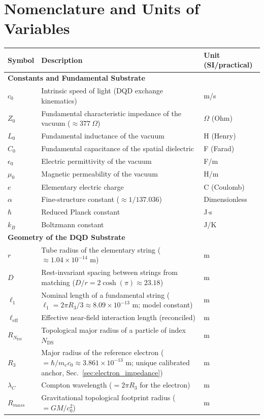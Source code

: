 \documentclass[11pt,a4paper]{article}
\theoremstyle{plain}
\theoremstyle{remark}
\newcommand{\Ncd}{\ensuremath{N_{\mathrm{DS}}}}
\begin{document}
\newpage
\section{Nomenclature and Units of Variables}
\begin{longtable}{l >{\raggedright\arraybackslash}p{8.8cm} l}
\toprule
\textbf{Symbol} & \textbf{Description} & \textbf{Unit (SI/practical)} \\
\midrule
\endhead

\multicolumn{3}{l}{\textbf{Constants and Fundamental Substrate}} \\
$c_0$ & Intrinsic speed of light (DQD exchange kinematics) & m/s \\
$Z_0$ & Fundamental characteristic impedance of the vacuum ($\approx 377~\Omega$) & $\Omega$ (Ohm) \\
$L_0$ & Fundamental inductance of the vacuum & H (Henry) \\
$C_0$ & Fundamental capacitance of the spatial dielectric & F (Farad) \\
$\epsilon_0$ & Electric permittivity of the vacuum & F/m \\
$\mu_0$ & Magnetic permeability of the vacuum & H/m \\
$e$ & Elementary electric charge & C (Coulomb) \\
$\alpha$ & Fine-structure constant ($\approx 1/137.036$) & Dimensionless \\
$\hbar$ & Reduced Planck constant & J$\cdot$s \\
$k_B$ & Boltzmann constant & J/K \\
\midrule

\multicolumn{3}{l}{\textbf{Geometry of the DQD Substrate}} \\
$r$ & Tube radius of the elementary string ($\approx 1.04 \times 10^{-14}$ m) & m \\
$D$ & Rest-invariant spacing between strings from matching ($D/r = 2\cosh(\pi) \approx 23.18$) & m \\
$\ell_1$ & Nominal length of a fundamental string ($\ell_1 = 2\pi R_3/3 \approx 8.09 \times 10^{-13}$ m; model constant) & m \\
$\ell_{\text{eff}}$ & Effective near-field interaction length (reconciled) & m \\
$R_{\Ncd}$ & Topological major radius of a particle of index $\Ncd$ & m \\
$R_3$ & Major radius of the reference electron ($= \hbar/m_e c_0 \approx 3.861 \times 10^{-13}$ m; unique calibrated anchor, Sec.~\ref{sec:electron_impedance}) & m \\
$\lambda_C$ & Compton wavelength ($= 2\pi R_3$ for the electron) & m \\
$R_{mass}$ & Gravitational topological footprint radius ($= GM/c_0^2$) & m \\
\midrule


\end{longtable}
\end{document}
